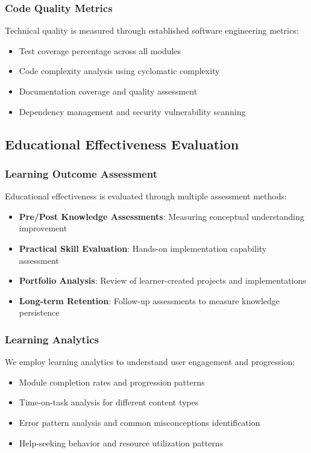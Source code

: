 \subsubsection{Code Quality Metrics}

Technical quality is measured through established software engineering metrics:

\begin{itemize}
    \item Test coverage percentage across all modules
    \item Code complexity analysis using cyclomatic complexity
    \item Documentation coverage and quality assessment
    \item Dependency management and security vulnerability scanning
\end{itemize}

\subsection{Educational Effectiveness Evaluation}

\subsubsection{Learning Outcome Assessment}

Educational effectiveness is evaluated through multiple assessment methods:

\begin{itemize}
    \item \textbf{Pre/Post Knowledge Assessments}: Measuring conceptual understanding improvement
    \item \textbf{Practical Skill Evaluation}: Hands-on implementation capability assessment
    \item \textbf{Portfolio Analysis}: Review of learner-created projects and implementations
    \item \textbf{Long-term Retention}: Follow-up assessments to measure knowledge persistence
\end{itemize}

\subsubsection{Learning Analytics}

We employ learning analytics to understand user engagement and progression:

\begin{itemize}
    \item Module completion rates and progression patterns
    \item Time-on-task analysis for different content types
    \item Error pattern analysis and common misconceptions identification
    \item Help-seeking behavior and resource utilization patterns
\end{itemize}

